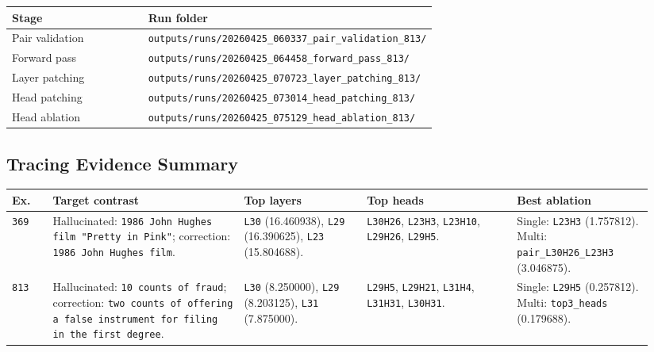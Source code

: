 \documentclass[11pt]{article}
\begin{document}
\begin{center}
\label{tab:artifacts-813}
\footnotesize
\setlength{\tabcolsep}{4pt}
\renewcommand{\arraystretch}{1.0}
\centering
\begin{tabular}{@{}lp{0.68\linewidth}@{}}
\toprule
\textbf{Stage} & \textbf{Run folder} \\
\midrule
Pair validation & \texttt{outputs/runs/20260425\_060337\_pair\_validation\_813/} \\
Forward pass & \texttt{outputs/runs/20260425\_064458\_forward\_pass\_813/} \\
Layer patching & \texttt{outputs/runs/20260425\_070723\_layer\_patching\_813/} \\
Head patching & \texttt{outputs/runs/20260425\_073014\_head\_patching\_813/} \\
Head ablation & \texttt{outputs/runs/20260425\_075129\_head\_ablation\_813/} \\
\bottomrule
\end{tabular}
\end{center}
\vspace{-0.8em}

\subsection{Tracing Evidence Summary}
\label{app:evidence}

\begin{center}
\label{tab:evidence}
\footnotesize
\setlength{\tabcolsep}{4pt}
\renewcommand{\arraystretch}{1.0}
\begin{tabular}{@{}p{0.06\linewidth}p{0.28\linewidth}p{0.18\linewidth}p{0.22\linewidth}p{0.20\linewidth}@{}}
\toprule
\textbf{Ex.} & \textbf{Target contrast} & \textbf{Top layers} & \textbf{Top heads} & \textbf{Best ablation} \\
\midrule
\texttt{369} & Hallucinated: \texttt{1986 John Hughes film "Pretty in Pink"}; correction: \texttt{1986 John Hughes film}. & \texttt{L30} (16.460938), \texttt{L29} (16.390625), \texttt{L23} (15.804688). & \texttt{L30H26}, \texttt{L23H3}, \texttt{L23H10}, \texttt{L29H26}, \texttt{L29H5}. & Single: \texttt{L23H3} (1.757812). Multi: \texttt{pair\_L30H26\_L23H3} (3.046875). \\
\texttt{813} & Hallucinated: \texttt{10 counts of fraud}; correction: \texttt{two counts of offering a false instrument for filing in the first degree}. & \texttt{L30} (8.250000), \texttt{L29} (8.203125), \texttt{L31} (7.875000). & \texttt{L29H5}, \texttt{L29H21}, \texttt{L31H4}, \texttt{L31H31}, \texttt{L30H31}. & Single: \texttt{L29H5} (0.257812). Multi: \texttt{top3\_heads} (0.179688). \\
\bottomrule
\end{tabular}
\end{center}
\end{document}
